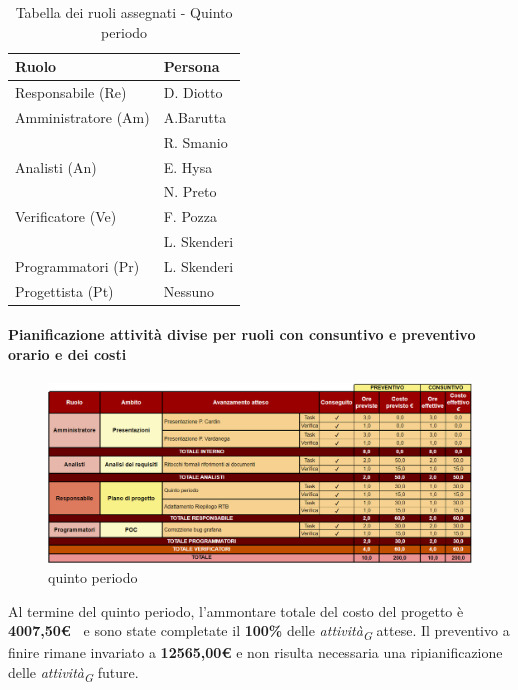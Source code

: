 \begin{table}[H]
    \centering
    \begin{tabular}{|L{4cm}|L{2cm}|}
    \hline
    \textbf{Ruolo} & \textbf{Persona} \\
    \hline
    \hline
    Responsabile (Re)   & D. Diotto \\
    \hline
    Amministratore (Am) & A.Barutta  \\
                        & R. Smanio \\
    \hline
    Analisti (An)       & E. Hysa \\
                        & N. Preto \\
    \hline
    Verificatore (Ve)   & F. Pozza \\
                        & L. Skenderi\\
     \hline
    Programmatori (Pr)  & L. Skenderi \\    
    \hline
    Progettista (Pt)    & Nessuno \\
    \hline
    \end{tabular}
    \caption{Tabella dei ruoli assegnati - Quinto periodo}
    \label{tab:Ruoli_persone_5}
    \end{table}

\newpage
\paragraph{Pianificazione attività divise per ruoli con consuntivo e preventivo orario e dei costi}

\begin{figure}[H]
    \centering
    \includegraphics[width=\linewidth, height=0.9\textheight, keepaspectratio]{../Images/periodo5.PNG}
    \caption{quinto periodo}
    \label{fig:Quinto_periodo}
\end{figure}

\vspace{1cm}

Al termine del quinto periodo, l'ammontare totale del costo del progetto è \textbf{4007,50\euro\ } e sono state completate il \textbf{100\%} delle \textit{attività}\textsubscript{\textit{G}} attese.
Il preventivo a finire rimane invariato a \textbf{12565,00€} e non risulta necessaria una ripianificazione delle \textit{attività}\textsubscript{\textit{G}} future.

